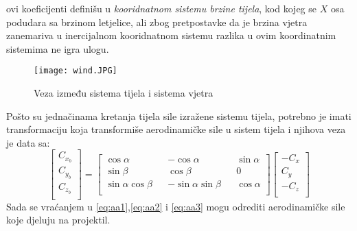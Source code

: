 ovi koeficijenti definišu u \textit{kooridnatnom sistemu brzine tijela}, kod kojeg se $X$ osa podudara sa 
brzinom letjelice, ali zbog pretpostavke da je brzina vjetra zanemariva u inercijalnom kooridnatnom sistemu razlika 
u ovim koordinatnim sistemima ne igra ulogu. 
\begin{figure}[ht!]
    \centering
    \texttt{[image: wind.JPG]}
    \caption{Veza između sistema tijela i sistema vjetra}
    \label{fig:wind}
\end{figure}
Pošto su jednačinama kretanja tijela sile izražene sistemu tijela, potrebno
je imati transformaciju koja transformiše aerodinamičke sile u sistem tijela i njihova veza je data sa:
\begin{equation}
    \begin{bmatrix}
        C_{x_b}\\
        C_{y_b}\\
        C_{z_b}\\
    \end{bmatrix}=\begin{bmatrix}
        \cos\alpha && -\cos\alpha && \sin\alpha\\
        \sin\beta &&\cos\beta && 0\\
        \sin\alpha\cos\beta && -\sin\alpha\sin\beta && \cos\alpha\\
    \end{bmatrix}\begin{bmatrix}
        -C_x\\
        C_y\\
        -C_z\\
    \end{bmatrix}
\end{equation} Sada se vraćanjem u \ref{eq:aa1},\ref{eq:aa2} i \ref{eq:aa3} mogu odrediti 
aerodinamičke sile koje djeluju na projektil. 
